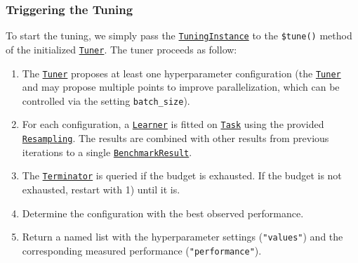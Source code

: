 \documentclass[]{article}
\newenvironment{Shaded}{}{}
\newcommand{\KeywordTok}[1]{\textcolor[rgb]{0.00,0.00,1.00}{#1}}
\newcommand{\NormalTok}[1]{#1}
\newcommand{\OperatorTok}[1]{#1}
\newcommand{\StringTok}[1]{\textcolor[rgb]{0.00,0.50,0.50}{#1}}
\providecommand{\tightlist}{%
  \setlength{\itemsep}{0pt}\setlength{\parskip}{0pt}}
\renewenvironment{Shaded} {\begin{snugshade}\small} {\end{snugshade}}
\begin{document}
\hypertarget{tuning-triggering}{%
\subsubsection{Triggering the Tuning}\label{tuning-triggering}}

To start the tuning, we simply pass the \href{https://mlr3tuning.mlr-org.com/reference/TuningInstance.html}{\texttt{TuningInstance}} to the \texttt{\$tune()} method of the initialized \href{https://mlr3tuning.mlr-org.com/reference/Tuner.html}{\texttt{Tuner}}.
The tuner proceeds as follow:

\begin{enumerate}
\def\labelenumi{\arabic{enumi}.}
\tightlist
\item
  The \href{https://mlr3tuning.mlr-org.com/reference/Tuner.html}{\texttt{Tuner}} proposes at least one hyperparameter configuration (the \href{https://mlr3tuning.mlr-org.com/reference/Tuner.html}{\texttt{Tuner}} and may propose multiple points to improve parallelization, which can be controlled via the setting \texttt{batch\_size}).
\item
  For each configuration, a \href{https://mlr3.mlr-org.com/reference/Learner.html}{\texttt{Learner}} is fitted on \href{https://mlr3.mlr-org.com/reference/Task.html}{\texttt{Task}} using the provided \href{https://mlr3.mlr-org.com/reference/Resampling.html}{\texttt{Resampling}}.
  The results are combined with other results from previous iterations to a single \href{https://mlr3.mlr-org.com/reference/BenchmarkResult.html}{\texttt{BenchmarkResult}}.
\item
  The \href{https://mlr3tuning.mlr-org.com/reference/Terminator.html}{\texttt{Terminator}} is queried if the budget is exhausted.
  If the budget is not exhausted, restart with 1) until it is.
\item
  Determine the configuration with the best observed performance.
\item
  Return a named list with the hyperparameter settings (\texttt{"values"}) and the corresponding measured performance (\texttt{"performance"}).
\end{enumerate}

\begin{Shaded}
\end{Shaded}
\end{document}

